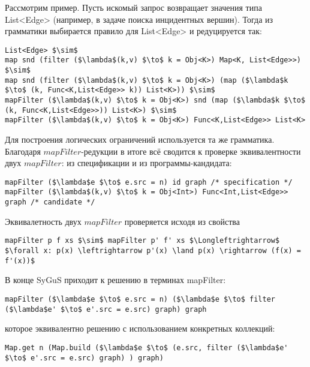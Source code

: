 \documentclass[14pt]{matmex-diploma-custom}
\begin{document}
Рассмотрим пример. Пусть искомый запрос возвращает значения типа List<Edge> (например, в задаче поиска инцидентных вершин). Тогда из грамматики выбирается правило для List<Edge> и редуцируется так:
\begin{lstlisting}[language=SyGuSLang, mathescape=true]
List<Edge> $\sim$
map snd (filter ($\lambda$(k,v) $\to$ k = Obj<K>) Map<K, List<Edge>>) $\sim$
map snd (filter ($\lambda$(k,v) $\to$ k = Obj<K>) (map ($\lambda$k $\to$ (k, Func<K,List<Edge>> k)) List<K>)) $\sim$
mapFilter ($\lambda$(k,v) $\to$ k = Obj<K>) snd (map ($\lambda$k $\to$ (k, Func<K,List<Edge>>)) List<K>) $\sim$
mapFilter ($\lambda$(k,v) $\to$ k = Obj<K>) Func<K,List<Edge>> List<K>
\end{lstlisting}

Для построения логических ограничений используется та же грамматика. Благодаря $mapFilter$-редукции в итоге всё сводится к проверке эквивалентности двух $mapFilter$: из спецификации и из программы-кандидата:

\begin{lstlisting}[language=SyGuSLang, mathescape=true, frame=none]
mapFilter ($\lambda$e $\to$ e.src = n) id graph /* specification */
mapFilter ($\lambda$(k,v) $\to$ k = Obj<Int>) Func<Int,List<Edge>> graph /* candidate */
\end{lstlisting}

Эквивалетность двух $mapFilter$ проверяется исходя из свойства
\begin{lstlisting}[language=SyGuSLang, mathescape=true, frame=none]
mapFilter p f xs $\sim$ mapFilter p' f' xs $\Longleftrightarrow$ $\forall x: p(x) \leftrightarrow p'(x) \land p(x) \rightarrow (f(x) = f'(x))$
\end{lstlisting}


В конце SyGuS приходит к решению в терминах mapFilter:

\begin{lstlisting}[language=SyGuSLang, mathescape=true, frame=none]
mapFilter ($\lambda$e $\to$ e.src = n) ($\lambda$e $\to$ filter ($\lambda$e' $\to$ e'.src = e.src) graph) graph
\end{lstlisting}

которое эквивалентно решению с использованием конкретных коллекций:
\begin{lstlisting}[language=SolutionLang, mathescape=true, frame=none]
Map.get n (Map.build ($\lambda$e $\to$ (e.src, filter ($\lambda$e' $\to$ e'.src = e.src) graph) ) graph)
\end{lstlisting}
\end{document}
